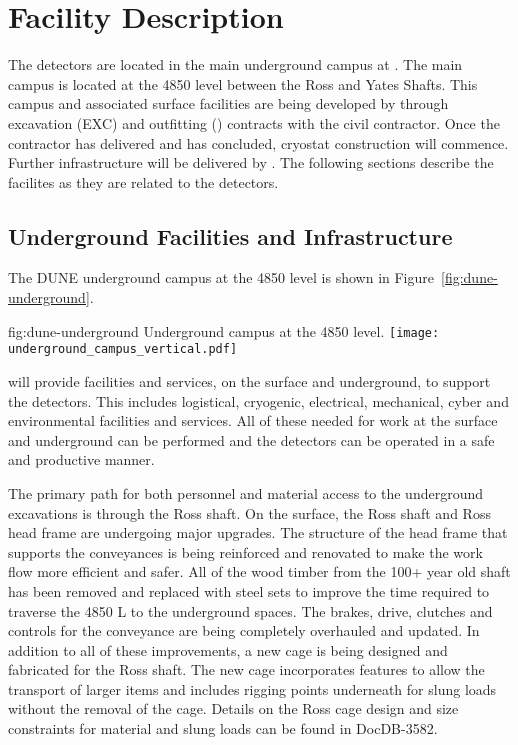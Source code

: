 \chapter{Facility Description}
\label{vl:tc-facility}

The  detectors are located in the main underground campus
at . The main campus is located at the 4850 level between
the Ross and Yates Shafts. This campus and associated surface
facilities are being developed by  through excavation
(EXC) and outfitting () contracts with the civil
contractor. Once the contractor has delivered and  has
concluded, cryostat construction will commence. Further infrastructure
will be delivered by .  The following sections describe
the facilites as they are related to the  detectors.

\section{Underground Facilities and Infrastructure}
\label{sec:fdsp-coord-uderground-excavation}

The DUNE underground campus at the  4850 level is shown in
Figure~\ref{fig:dune-underground}.
\begin{dunefigure}{fig:dune-underground}
  {Underground campus at the 4850 level.}
  \texttt{[image: underground\_campus\_vertical.pdf]}
\end{dunefigure}
 will provide facilities and services, on the surface and
underground, to support the  detectors.  This includes
logistical, cryogenic, electrical, mechanical, cyber and environmental
facilities and services.  All of these needed for work at the surface
and underground can be performed and the detectors can be operated in
a safe and productive manner.

The primary path for both personnel and material access to the
underground excavations is through the Ross shaft. On the surface, the
Ross shaft and Ross head frame are undergoing major upgrades. The
structure of the head frame that supports the conveyances is being
reinforced and renovated to make the work flow more efficient and
safer.  All of the wood timber from the 100+ year old shaft has been
removed and replaced with steel sets to improve the time required to
traverse the 4850 L to the underground spaces.  The brakes, drive,
clutches and controls for the conveyance are being completely
overhauled and updated.  In addition to all of these improvements, a
new cage is being designed and fabricated for the Ross shaft.  The new
cage incorporates features to allow the transport of larger items and
includes rigging points underneath for slung loads without the removal
of the cage.  Details on the Ross cage design and size constraints for
material and slung loads can be found in DocDB-3582.

